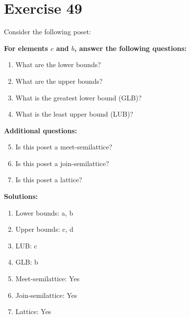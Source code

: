 \documentclass{article}
\begin{document}
\section*{Exercise 49}
Consider the following poset:
\begin{center}
\end{center}

    \textbf{For elements $c$ and $b$, answer the following questions:}
\begin{enumerate}
    \item What are the lower bounds?
    \item What are the upper bounds?
    \item What is the greatest lower bound (GLB)?
    \item What is the least upper bound (LUB)?
\end{enumerate}
    \hspace*{3ex} \textbf{Additional questions:}
\begin{enumerate}
    \setcounter{enumi}{4}
    \item Is this poset a meet-semilattice?
    \item Is this poset a join-semilattice?
    \item Is this poset a lattice?
\end{enumerate}

\textbf{Solutions:}
\begin{enumerate}
    \item Lower bounds: {a, b}
    \item Upper bounds: {c, d}
    \item LUB: c
    \item GLB: b
    \item Meet-semilattice: Yes
    \item Join-semilattice: Yes
    \item Lattice: Yes
\end{enumerate}
\newpage
\end{document}
